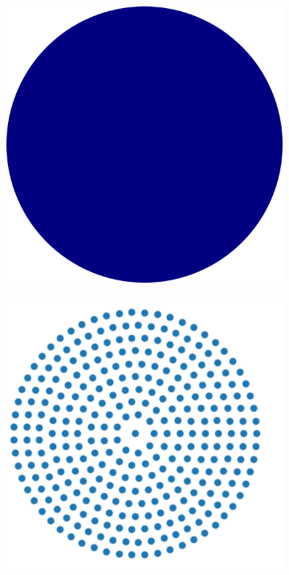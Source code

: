 \documentclass[preprint,12pt]{elsarticle}
\begin{document}
\begin{figure}[!htpb]
  \centering
  \begin{subfigure}{0.22\textwidth}
    \centering
    \includegraphics[width=1.0\textwidth]{images/rfc_explantion_schematic/real_spherical_particles}
  \end{subfigure}\hspace{15mm}%
  \begin{subfigure}{0.24\textwidth}
    \centering
    \includegraphics[width=1.0\textwidth]{images/rfc_explantion_schematic/sph_sampled_spherical_particles}

\end{subfigure}
\end{figure}
\end{document}
